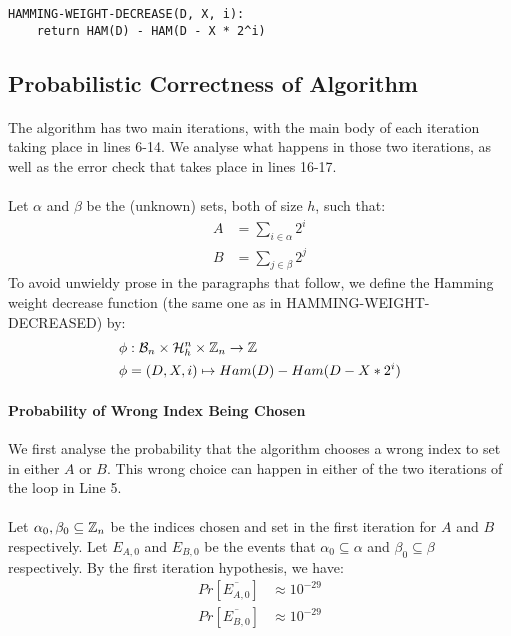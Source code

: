 \begin{lstlisting}
HAMMING-WEIGHT-DECREASE(D, X, i):
    return HAM(D) - HAM(D - X * 2^i)
\end{lstlisting}

\subsection{Probabilistic Correctness of Algorithm}
\paragraph{}
The algorithm has two main iterations, with the main body of each iteration taking place in lines 6-14. We analyse what happens in those two iterations, as well as the error check that takes place in lines 16-17.

\paragraph{}
Let $\alpha$ and $\beta$ be the (unknown) sets, both of size $h$, such that:
\begin{align*}
    A &= \sum_{i \in \alpha} 2^i\\
    B &= \sum_{j \in \beta} 2^j
\end{align*}
To avoid unwieldy prose in the paragraphs that follow, we define the Hamming weight decrease function (the same one as in HAMMING-WEIGHT-DECREASED) by:
\begin{align*}
    \phi &: \mathcal{B}_n \times \mathcal{H}_h^n \times \mathbb{Z}_n \rightarrow \mathbb{Z}\\
    \phi &= (D, X, i) \mapsto Ham(D) - Ham(D - X * 2^i)
\end{align*}

\paragraph{Probability of Wrong Index Being Chosen}
We first analyse the probability that the algorithm chooses a wrong index to set in either $A$ or $B$. This wrong choice can happen in either of the two iterations of the loop in Line 5.

\paragraph{}
Let $\alpha_0, \beta_0 \subseteq \mathbb{Z}_n$ be the indices chosen and set in the first iteration for $A$ and $B$ respectively. Let $E_{A,0}$ and $E_{B,0}$ be the events that $\alpha_0 \subseteq \alpha$ and $\beta_0 \subseteq \beta$ respectively. By the first iteration hypothesis, we have:
\begin{align*}
    Pr[\overline{E_{A,0}}] &\approx 10^{-29}\\
    Pr[\overline{E_{B,0}}] &\approx 10^{-29}
\end{align*}

